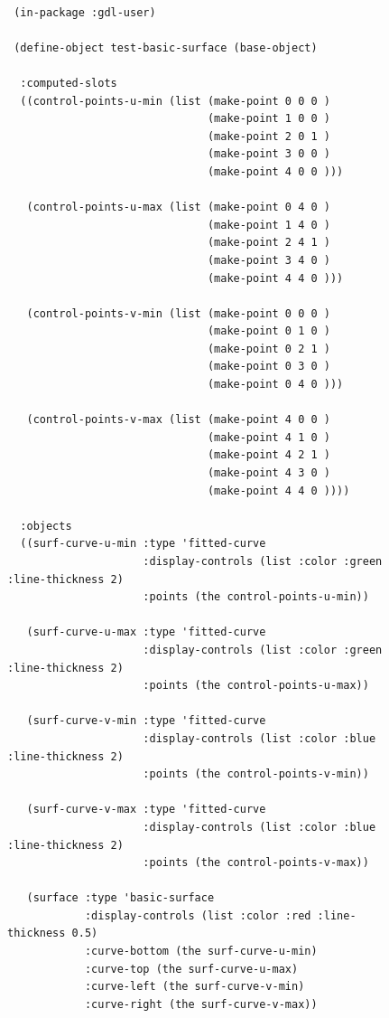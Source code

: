 \documentclass [11pt]{book}
\begin{document}
\begin{itemize}
\begin{figure}
\begin{lrbox}{\boxedverb}
\begin{minipage}{\linewidth}
{\begin{verbatim}
 
 (in-package :gdl-user)   

 (define-object test-basic-surface (base-object)
  
  :computed-slots
  ((control-points-u-min (list (make-point 0 0 0 )
                               (make-point 1 0 0 )
                               (make-point 2 0 1 )
                               (make-point 3 0 0 )
                               (make-point 4 0 0 )))
   
   (control-points-u-max (list (make-point 0 4 0 )
                               (make-point 1 4 0 )
                               (make-point 2 4 1 )
                               (make-point 3 4 0 )
                               (make-point 4 4 0 )))
   
   (control-points-v-min (list (make-point 0 0 0 )
                               (make-point 0 1 0 )
                               (make-point 0 2 1 )
                               (make-point 0 3 0 )
                               (make-point 0 4 0 )))
                              
   (control-points-v-max (list (make-point 4 0 0 )
                               (make-point 4 1 0 )
                               (make-point 4 2 1 )
                               (make-point 4 3 0 )
                               (make-point 4 4 0 ))))
  
  :objects
  ((surf-curve-u-min :type 'fitted-curve
                     :display-controls (list :color :green :line-thickness 2)
                     :points (the control-points-u-min))
   
   (surf-curve-u-max :type 'fitted-curve
                     :display-controls (list :color :green :line-thickness 2)
                     :points (the control-points-u-max))
     
   (surf-curve-v-min :type 'fitted-curve
                     :display-controls (list :color :blue :line-thickness 2)
                     :points (the control-points-v-min))
   
   (surf-curve-v-max :type 'fitted-curve
                     :display-controls (list :color :blue :line-thickness 2)
                     :points (the control-points-v-max))
      
   (surface :type 'basic-surface
            :display-controls (list :color :red :line-thickness 0.5)
            :curve-bottom (the surf-curve-u-min)
            :curve-top (the surf-curve-u-max)
            :curve-left (the surf-curve-v-min)
            :curve-right (the surf-curve-v-max))


\end{verbatim}}
\end{minipage}
\end{lrbox}
\end{figure}
\end{itemize}
\end{document}
